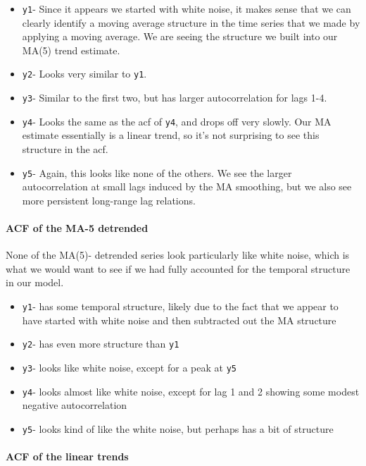 \documentclass[
  letterpaper,
  DIV=11,
  numbers=noendperiod]{scrartcl}
\let\oldparagraph\paragraph
\renewcommand{\paragraph}[1]{\oldparagraph{#1}\mbox{}}
\providecommand{\tightlist}{%
  \setlength{\itemsep}{0pt}\setlength{\parskip}{0pt}}\usepackage{longtable,booktabs,array}
\begin{document}
\begin{itemize}
\tightlist
\item
  \texttt{y1}- Since it appears we started with white noise, it makes
  sense that we can clearly identify a moving average structure in the
  time series that we made by applying a moving average. We are seeing
  the structure we built into our MA(5) trend estimate.
\item
  \texttt{y2}- Looks very similar to \texttt{y1}.
\item
  \texttt{y3}- Similar to the first two, but has larger autocorrelation
  for lags 1-4.
\item
  \texttt{y4}- Looks the same as the acf of \texttt{y4}, and drops off
  very slowly. Our MA estimate essentially is a linear trend, so it's
  not surprising to see this structure in the acf.
\item
  \texttt{y5}- Again, this looks like none of the others. We see the
  larger autocorrelation at small lags induced by the MA smoothing, but
  we also see more persistent long-range lag relations.
\end{itemize}

\paragraph{ACF of the MA-5 detrended}\label{acf-of-the-ma-5-detrended}

None of the MA(5)- detrended series look particularly like white noise,
which is what we would want to see if we had fully accounted for the
temporal structure in our model.

\begin{itemize}
\tightlist
\item
  \texttt{y1}- has some temporal structure, likely due to the fact that
  we appear to have started with white noise and then subtracted out the
  MA structure
\item
  \texttt{y2}- has even more structure than \texttt{y1}
\item
  \texttt{y3}- looks like white noise, except for a peak at \texttt{y5}
\item
  \texttt{y4}- looks almost like white noise, except for lag 1 and 2
  showing some modest negative autocorrelation
\item
  \texttt{y5}- looks kind of like the white noise, but perhaps has a bit
  of structure
\end{itemize}

\paragraph{ACF of the linear trends}\label{acf-of-the-linear-trends}
\end{document}
